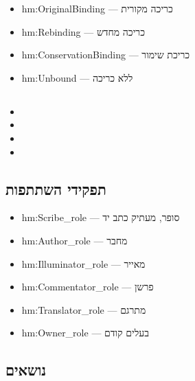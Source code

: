\begin{itemize}
\item hm:OriginalBinding — כריכה מקורית
\item hm:Rebinding — כריכה מחדש
\item hm:ConservationBinding — כריכת שימור
\item hm:Unbound — ללא כריכה
\end{itemize}

\subsection{}

\begin{itemize}
\item {}
\item {}
\item {}
\item {}
\end{itemize}

\subsection{תפקידי השתתפות}

\begin{itemize}
\item hm:Scribe\_role — סופר, מעתיק כתב יד
\item hm:Author\_role — מחבר
\item hm:Illuminator\_role — מאייר
\item hm:Commentator\_role — פרשן
\item hm:Translator\_role — מתרגם
\item hm:Owner\_role — בעלים קודם
\end{itemize}

\subsection{נושאים}

